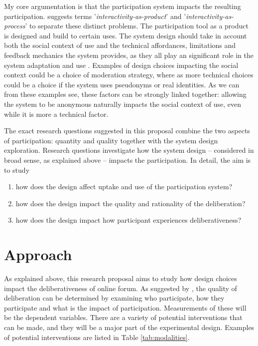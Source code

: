\documentclass{article}
\begin{document}
My core argumentation is that the participation system impacts the resulting participation.  suggests terms '\textit{interactivity-as-product}' and '\textit{interactivity-as-process}' to separate these distinct problems. The participation tool as a product is designed and build to certain uses. The system design should take in account both the social context of use and the technical affordances, limitations and feedback mechanics the system provides, as they all play an significant role in the system adaptation and use . Examples of design choices impacting the social context could be a choice of moderation strategy, where as more technical choices could be a choice if the system uses pseudonyms or real identities. As we can from these examples see, these factors can be strongly linked together: allowing the system to be anonymous naturally impacts the social context of use, even while it is more a technical factor.

The exact research questions suggested in this proposal combine the two aspects of participation: quantity and quality  together with the system design exploration. Research questions investigate how the system design -- considered in broad sense, as explained above -- impacts the participation. In detail, the aim is to study

\begin{enumerate}
\item how does the design affect uptake and use of the participation system?
\item how does the design impact the quality and rationality of the deliberation?
\item how does the design impact how participant experiences deliberativeness?
\end{enumerate}

\section{Approach}

As explained above, this research proposal aims to study how design choices impact the deliberativeness of online forum. As suggested by , the quality of deliberation can be determined by examining who participate, how they participate and what is the impact of participation. Measurements of these will be the dependent variables. There are a variety of potential interventions that can be made, and they will be a major part of the experimental design. Examples of potential interventions are listed in Table \ref{tab:modalities}.
\end{document}
